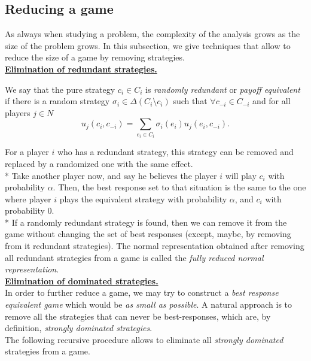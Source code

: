 \subsection{Reducing a game}
\label{chap2:sec:reduction}

As always when studying a problem, the complexity of the analysis grows as the size of the problem grows.
In this subsection, we give techniques that allow to reduce the size of a game by removing strategies.\\

\noindent\textbf{\underline{Elimination of redundant strategies.}}

\begin{definition}
We say that the pure strategy $c_i \in C_i$ is \emph{randomly redundant} or \emph{payoff equivalent} if there is a random strategy $\sigma_i \in \Delta(C_i \setminus c_i)$ such that $\forall c_{-i} \in C_{-i}$ and for all players $j \in N$
$$u_j(c_i, c_{-i}) = \sum_{e_i \in C_i} \sigma_i(e_i) u_j(e_i, c_{-i}).$$
\end{definition}

For a player $i$ who has a redundant strategy, this strategy can be removed and replaced by a randomized one with the same effect. \\*
Take another player now, and say he believes the player $i$ will play $c_i$ with probability $\alpha$. Then, the best response set to that situation is the same to the one where player $i$ plays the equivalent strategy with probability $\alpha$, and $c_i$ with probability 0.\\*
If a randomly redundant strategy is found, then we can remove it from the game without changing the set of best responses (except, maybe, by removing from it redundant strategies).
The normal representation obtained after removing all redundant strategies from a game is called the \emph{fully reduced normal representation}. \\

\noindent\textbf{\underline{Elimination of dominated strategies.}} \\

In order to further reduce a game, we may try to construct a \emph{best response equivalent game} which would be \emph{as small as possible}. A natural approach is to remove all the strategies that can never be best-responses, which are, by definition, \emph{strongly dominated strategies}.\\
The following recursive procedure allows to eliminate all \emph{strongly dominated} strategies from a game.

